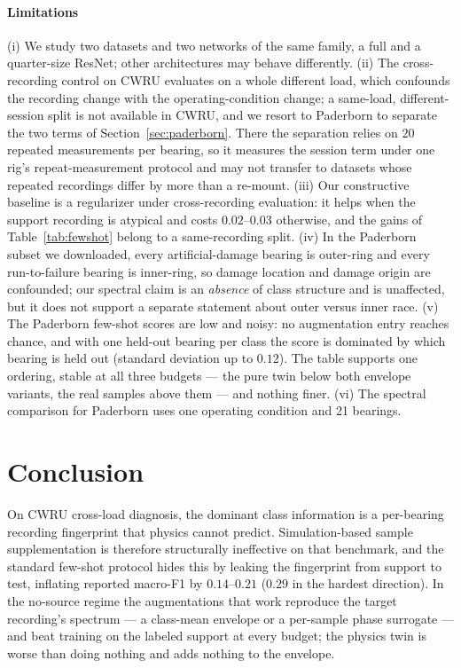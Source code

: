 \documentclass[preprint,12pt]{elsarticle}
\begin{document}
\paragraph{Limitations} (i) We study two datasets and two networks of the same
family, a full and a quarter-size ResNet; other architectures may behave
differently. (ii) The
cross-recording control on CWRU evaluates on a whole different load, which
confounds the recording change with the operating-condition change; a same-load,
different-session split is not available in CWRU, and we resort to Paderborn to
separate the two terms of Section~\ref{sec:paderborn}. There the separation
relies on $20$ repeated measurements per bearing, so it measures the session
term under one rig's repeat-measurement protocol and may not transfer to
datasets whose repeated recordings differ by more than a re-mount. (iii) Our
constructive baseline is a regularizer under cross-recording evaluation: it
helps when the support recording is atypical and costs $0.02$--$0.03$ otherwise,
and the gains of Table~\ref{tab:fewshot} belong to a same-recording split.
(iv) In the Paderborn subset we downloaded, every artificial-damage bearing is
outer-ring and every run-to-failure bearing is inner-ring, so damage location
and damage origin are confounded; our spectral claim is an \emph{absence} of
class structure and is unaffected, but it does not support a separate statement
about outer versus inner race. (v) The Paderborn few-shot scores are low and
noisy: no augmentation entry reaches chance, and with one held-out bearing per
class the score is dominated by which bearing is held out (standard deviation
up to $0.12$). The table supports one ordering, stable at all three budgets ---
the pure twin below both envelope variants, the real samples above them --- and
nothing finer. (vi) The spectral
comparison for Paderborn uses one operating condition and 21 bearings.

\section{Conclusion}
\label{sec:conclusion}

On CWRU cross-load diagnosis, the dominant class information is a per-bearing
recording fingerprint that physics cannot predict. Simulation-based sample
supplementation is therefore structurally ineffective on that benchmark, and
the standard few-shot protocol hides this by leaking the fingerprint from
support to test, inflating reported macro-F1 by $0.14$--$0.21$ ($0.29$ in the
hardest direction). In the no-source regime the augmentations that work
reproduce the target recording's spectrum --- a class-mean envelope or a
per-sample phase surrogate --- and beat training on the labeled support at
every budget; the physics twin is worse than doing nothing and adds nothing to
the envelope.
\end{document}
